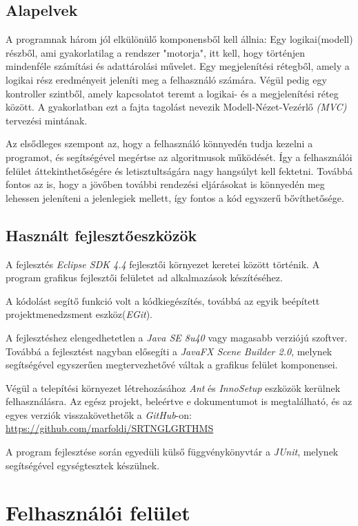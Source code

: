 \documentclass{elteikthesis}
\begin{document}
\subsection{Alapelvek}
A programnak három jól elkülönülő komponensből kell állnia:
Egy logikai(modell) részből, ami gyakorlatilag a rendszer "motorja", itt kell, hogy történjen mindenféle számítási és adattárolási művelet. Egy megjelenítési rétegből, amely a logikai rész eredményeit jeleníti meg a felhasználó számára. Végül pedig egy kontroller szintből, amely kapcsolatot teremt a logikai- és a megjelenítési réteg között. A gyakorlatban ezt a fajta tagolást nevezik Modell-Nézet-Vezérlő \emph{(MVC)} tervezési mintának.\par
Az elsődleges szempont az, hogy a felhasználó könnyedén tudja kezelni a programot, és segítségével megértse az algoritmusok működését. Így a felhasználói felület áttekinthetőségére és letisztultságára nagy hangsúlyt kell fektetni. Továbbá fontos az is, hogy a jövőben további rendezési eljárásokat is könnyedén meg lehessen jeleníteni a jelenlegiek mellett, így fontos a kód egyszerű bővíthetősége.

\subsection{Használt fejlesztőeszközök}
A fejlesztés \emph{Eclipse SDK 4.4} fejlesztői környezet keretei között történik. A program grafikus fejlesztői felületet ad alkalmazások készítéséhez.\par
A kódolást segítő funkció volt a kódkiegészítés, továbbá az egyik beépített projektmenedzsment eszköz(\emph{EGit}).\par
A fejlesztéshez elengedhetetlen a \emph{Java SE 8u40} vagy magasabb verziójú szoftver. Továbbá a fejlesztést nagyban elősegíti a \emph{JavaFX Scene Builder 2.0}, melynek segítségével egyszerűen megtervezhetővé váltak a grafikus felület komponensei.\par
Végül a telepítési környezet létrehozásához \emph{Ant} és \emph{InnoSetup} eszközök kerülnek felhasználásra.
Az egész projekt, beleértve e dokumentumot is megtalálható, és az egyes verziók visszakövethetők a \emph{GitHub}-on: \url{https://github.com/marfoldi/SRTNGLGRTHMS}\par
A program fejlesztése során egyedüli külső függvénykönyvtár a \emph{JUnit}, melynek segítségével egységtesztek készülnek.

\section{Felhasználói felület}
\end{document}
